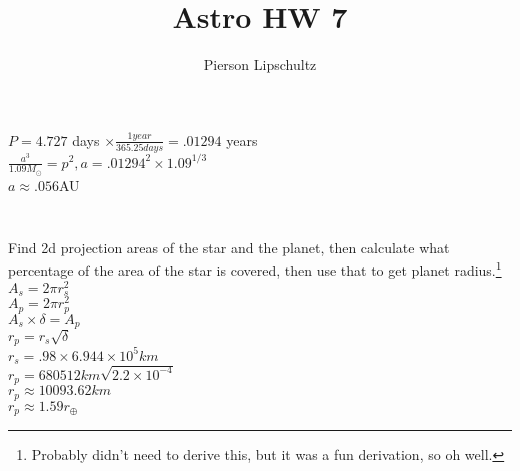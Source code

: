 \documentclass{article}
\title{Astro HW 7}
\author{Pierson Lipschultz}
\begin{document}
\maketitle
\setcounter{section}{7}

\subsection{}
\subsubsection{}

\begin{center} 
    \(P = 4.727\) days \(\times \frac{1 year}{365.25days} = .01294\) years \\
    \(\frac{a^3}{1.09 M_\odot} = p^2, a = .01294^2 \times 1.09 ^{1/3}\) \\
    \(a \approx .056\)AU 
\end{center}

\subsubsection{}

\begin{center}
    \\
    Find 2d projection areas of the star and the planet, then calculate what percentage of the area of the star is covered, then use that to get planet radius.\footnote{Probably didn't need to derive this, but it was a fun derivation, so oh well.}\\
    \(A_s = 2\pi r_s^2\)\\
    \(A_p = 2\pi r_p^2\)\\
    \(A_s \times \delta = A_p\)\\
    \(r_p = r_s \sqrt{\delta}\) \\
    \(r_s = .98 \times 6.944 \times 10^5km\)\\
    \(r_p = 680512km\sqrt{2.2\times10^{-4}}\)\\
    \(r_p \approx 10093.62km\) \\
    \(r_p \approx 1.59 r_\oplus\)
\end{center}
\end{document}
